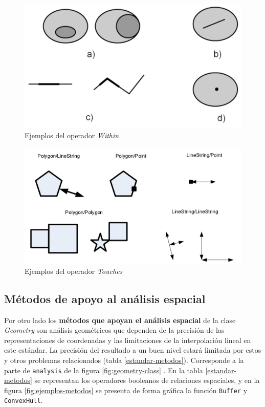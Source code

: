  \begin{figure}[H]
	\centering
	\includegraphics[width=0.69\linewidth]{imagenes/capitulo4/within}
	\caption{Ejemplos del operador \textit{Within} \cite{estandar}}
	\label{fig:within}
\end{figure}

 \begin{figure}[H]
 	\centering
 	\includegraphics[width=0.86\linewidth]{imagenes/capitulo4/touches1}
 	\caption{Ejemplos del operador \textit{Touches} \cite{estandar}}
 	\label{fig:touches}
 \end{figure}

\subsection{Métodos de apoyo al análisis espacial}

Por otro lado los \textbf{métodos que apoyan el análisis espacial} de la clase \textit{Geometry} son análisis geométricos que dependen de la precisión de las representaciones de coordenadas y las limitaciones de la interpolación lineal en este estándar. La precisión del resultado a un buen nivel estará limitada por estos y otros problemas relacionados (tabla \ref{estandar-metodos}). Corresponde a la parte de \texttt{analysis} de la figura \ref{fig:geometry-class} \cite{estandar}. En la tabla \ref{estandar-metodos} se representan los operadores booleanos de relaciones espaciales, y en la figura \ref{fig:ejemplos-metodos} se presenta de forma gráfica la función \texttt{Buffer} y \texttt{ConvexHull}.


